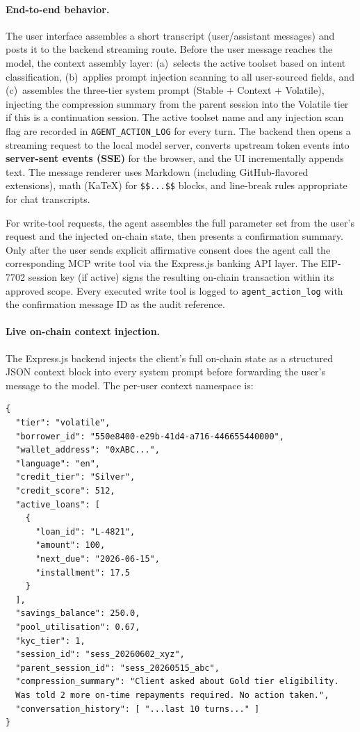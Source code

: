 \documentclass[12pt,a4paper]{report}
\begin{document}
\paragraph{End-to-end behavior.}
The user interface assembles a short transcript (user/assistant messages) and posts it to the backend streaming route. Before the user message reaches the model, the context assembly layer: (a)~selects the active toolset based on intent classification, (b)~applies prompt injection scanning to all user-sourced fields, and (c)~assembles the three-tier system prompt (Stable + Context + Volatile), injecting the compression summary from the parent session into the Volatile tier if this is a continuation session. The active toolset name and any injection scan flag are recorded in \texttt{AGENT\_ACTION\_LOG} for every turn. The backend then opens a streaming request to the local model server, converts upstream token events into \textbf{server-sent events (SSE)} for the browser, and the UI incrementally appends text. The message renderer uses Markdown (including GitHub-flavored extensions), math (KaTeX) for \texttt{\$\$...\$\$} blocks, and line-break rules appropriate for chat transcripts.

For write-tool requests, the agent assembles the full parameter set from the user's request and the injected on-chain state, then presents a confirmation summary. Only after the user sends explicit affirmative consent does the agent call the corresponding MCP write tool via the Express.js banking API layer. The EIP-7702 session key (if active) signs the resulting on-chain transaction within its approved scope. Every executed write tool is logged to \texttt{agent\_action\_log} with the confirmation message ID as the audit reference.

\paragraph{Live on-chain context injection.}
The Express.js backend injects the client's full on-chain state as a structured JSON context block into every system prompt before forwarding the user's message to the model. The per-user context namespace is:
\begin{verbatim}
{
  "tier": "volatile",
  "borrower_id": "550e8400-e29b-41d4-a716-446655440000",
  "wallet_address": "0xABC...",
  "language": "en",
  "credit_tier": "Silver",
  "credit_score": 512,
  "active_loans": [
    {
      "loan_id": "L-4821",
      "amount": 100,
      "next_due": "2026-06-15",
      "installment": 17.5
    }
  ],
  "savings_balance": 250.0,
  "pool_utilisation": 0.67,
  "kyc_tier": 1,
  "session_id": "sess_20260602_xyz",
  "parent_session_id": "sess_20260515_abc",
  "compression_summary": "Client asked about Gold tier eligibility.
  Was told 2 more on-time repayments required. No action taken.",
  "conversation_history": [ "...last 10 turns..." ]
}
\end{verbatim}
\end{document}
